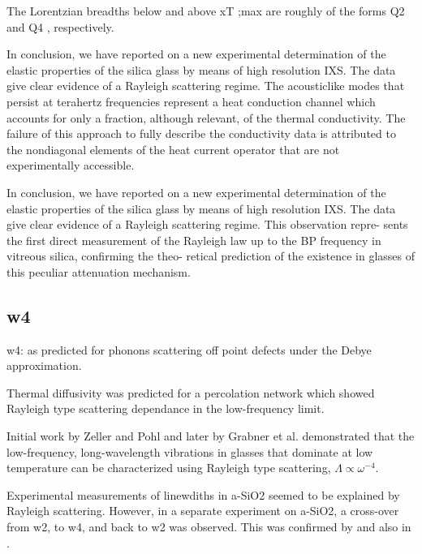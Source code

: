 \documentclass[aps,prb,twocolumn,superscriptaddress,footinbib,amsmath,amssymb,floatfix]{revtex4}
\begin{document}
The Lorentzian breadths below and above xT ;max are roughly of the 
forms Q2 and Q4 , respectively.\cite{feldman_calculations_2002}


In conclusion, we have reported on a new experimental
determination of the elastic properties of the silica glass by
means of high resolution IXS. The data give clear evidence
of a Rayleigh scattering regime.\cite{baldi_thermal_2008} 
The acousticlike modes that persist at
terahertz frequencies represent a heat conduction channel which accounts 
for only a fraction, although relevant,
of the thermal conductivity. The failure of this approach to fully 
describe the conductivity data is attributed to
the nondiagonal elements of the heat current operator that are not 
experimentally accessible.\cite{baldi_thermal_2008}

In conclusion, we have reported on a new experimental
determination of the elastic properties of the silica glass by
means of high resolution IXS. The data give clear evidence
of a Rayleigh scattering regime. This observation repre-
sents the first direct measurement of the Rayleigh law up to
the BP frequency in vitreous silica, confirming the theo-
retical prediction of the existence in glasses of this peculiar
attenuation mechanism.\cite{baldi_sound_2010} 



\subsection{\label{S:Theory:Thermal}w4}

w4: as predicted for phonons scattering off point defects under 
the Debye approximation.

Thermal diffusivity was predicted for a percolation network which showed 
Rayleigh type scattering dependance in the low-frequency limit.
\cite{sheng_heat_1991}

Initial work by Zeller and Pohl\cite{zeller_thermal_1971} 
and later by Grabner et al.\cite{graebner_phonon_1986}  
demonstrated that the low-frequency, long-wavelength 
vibrations in glasses that dominate at low temperature can 
be characterized using Rayleigh 
type scattering, $\Lambda \propto \omega^{-4}$. 

Experimental measurements of linewdiths in a-SiO2 
seemed to be explained by Rayleigh scattering.
\cite{wischnewski_sound-wave_1998}
However, in a separate experiment on a-SiO2, 
a cross-over from w2, to w4, and back to w2 was observed.
\cite{masciovecchio_evidence_2006} This was confirmed 
by \cite{baldi_elastic_2011} and also in 
\cite{baldi_emergence_2013}.
\end{document}

